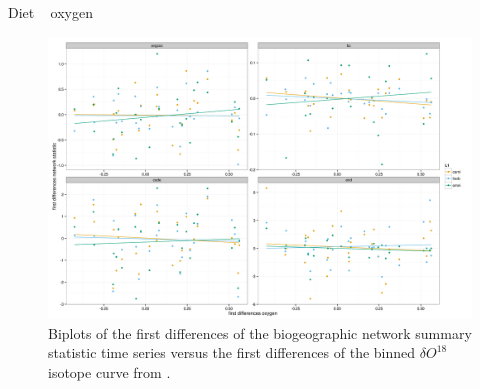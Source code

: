 \documentclass[final]{beamer}\usepackage[]{graphicx}\usepackage[]{color}
\newlength{\onecolwid}
\newlength{\twocolwid}
\begin{document}
\begin{frame}[t]
\begin{columns}[t]
\begin{column}{\twocolwid}
\begin{columns}[t,totalwidth = \twocolwid]
        \begin{column}{\onecolwid}
          \begin{block}{Diet ~ oxygen}
            \begin{figure}[ht]
              \centering
              \includegraphics[height = 0.2\textheight]{figure/dt_oxy}
              \caption{Biplots of the first differences of the biogeographic network summary statistic time series versus the first differences of the binned \(\delta O^{18}\) isotope curve from \citep{Zachos2008}.}
              \label{fig:cor}
            \end{figure}
          \end{block}
        \end{column}
      \end{columns}


    \end{column}


\end{columns}
\end{frame}
\end{document}
